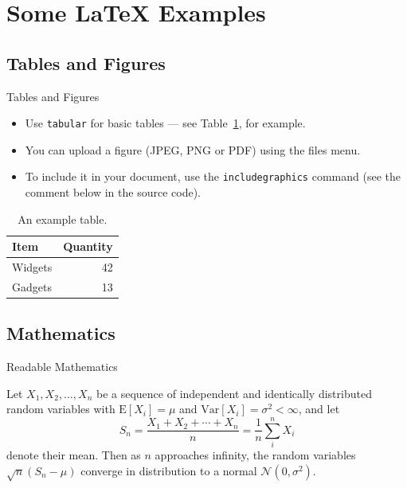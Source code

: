 \documentclass{beamer}
\begin{document}
\section{Some \LaTeX{} Examples}

\subsection{Tables and Figures}

\begin{frame}{Tables and Figures}

\begin{itemize}
\item Use \texttt{tabular} for basic tables --- see Table~\ref{tab:widgets}, for example.
\item You can upload a figure (JPEG, PNG or PDF) using the files menu. 
\item To include it in your document, use the \texttt{includegraphics} command (see the comment below in the source code).
\end{itemize}


\begin{table}
\centering
\begin{tabular}{l|r}
Item & Quantity \\\hline
Widgets & 42 \\
Gadgets & 13
\end{tabular}
\caption{\label{tab:widgets}An example table.}
\end{table}

\end{frame}

\subsection{Mathematics}

\begin{frame}{Readable Mathematics}

Let $X_1, X_2, \ldots, X_n$ be a sequence of independent and identically distributed random variables with $\text{E}[X_i] = \mu$ and $\text{Var}[X_i] = \sigma^2 < \infty$, and let
$$S_n = \frac{X_1 + X_2 + \cdots + X_n}{n}
      = \frac{1}{n}\sum_{i}^{n} X_i$$
denote their mean. Then as $n$ approaches infinity, the random variables $\sqrt{n}(S_n - \mu)$ converge in distribution to a normal $\mathcal{N}(0, \sigma^2)$.

\end{frame}
\end{document}

